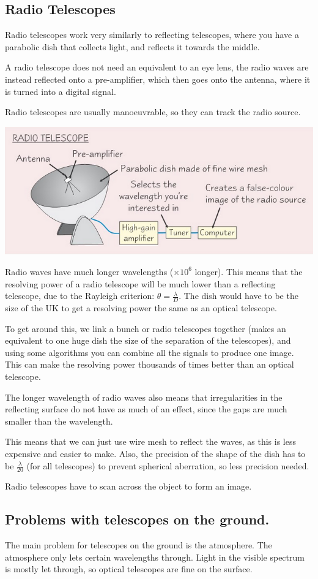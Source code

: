 \documentclass[a4paper, 12pt]{article}
\begin{document}
\subsection{Radio Telescopes}

Radio telescopes work very similarly to reflecting telescopes, where you have a parabolic dish that collects light, and reflects it towards the middle.

A radio telescope does not need an equivalent to an eye lens, the radio waves are instead reflected onto a pre-amplifier, which then goes onto the antenna, where it is turned into a digital signal.

Radio telescopes are usually manoeuvrable, so they can track the radio source.

\begin{center}
\includegraphics[width=\textwidth]{images/radioTelescope.png}
\end{center}

Radio waves have much longer wavelengths ($\times 10^6$ longer). This means that the resolving power of a radio telescope will be much lower than a reflecting telescope, due to the Rayleigh criterion: $\theta = \frac{\lambda}{D}$. The dish would have to be the size of the UK to get a resolving power the same as an optical telescope.

To get around this, we link a bunch or radio telescopes together (makes an equivalent to one huge dish the size of the separation of the telescopes), and using some algorithms you can combine all the signals to produce one image. This can make the resolving power thousands of times better than an optical telescope.

The longer wavelength of radio waves also means that irregularities in the reflecting surface do not have as much of an effect, since the gaps are much smaller than the wavelength.

This means that we can just use wire mesh to reflect the waves, as this is less expensive and easier to make. Also, the precision of the shape of the dish has to be $\frac{\lambda}{20}$ (for all telescopes) to prevent spherical aberration, so less precision needed.

Radio telescopes have to scan across the object to form an image.

\subsection{Problems with telescopes on the ground.}

The main problem for telescopes on the ground is the atmosphere. The atmosphere only lets certain wavelengths through. Light in the visible spectrum is mostly let through, so optical telescopes are fine on the surface.
\end{document}
